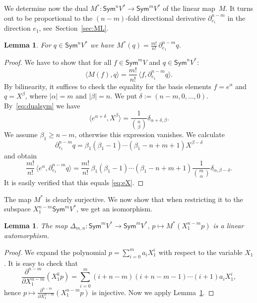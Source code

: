 \documentclass[11pt]{amsart}
\def\Sym{\mathsf{Sym}}
\numberwithin{equation}{section}
\newtheorem{lemma}[theorem]{Lemma}
\begin{document}
We determine now the dual $M^*\colon\Sym^n V^* \to \Sym^m V^*$
of the linear map~$M$. It turns out to be proportional to the $(n-m)$-fold directional 
derivative $\partial_{e_1}^{n-m}$ in the direction $e_1$, see~Section~\ref{sec:ML}.

\begin{lemma}\label{eq:dualM}
For $q\in\Sym^n V^*$ we have 
$M^*(q)=  \frac{m!}{n!}\, \partial_{e_1}^{n-m}q$. 
\end{lemma}

\begin{proof}
 We have to show that 
for all $f\in\Sym^mV$ and $q\in\Sym^n V^*$: 
$$
 \langle M(f), q \rangle = \frac{m!}{n!}\, \langle f, \partial_{e_1}^{n-m}q \rangle .
$$
By bilinearity, it suffices to check the equality for the basis elements 
$f=e^\alpha$ and $q=X^\beta$, where $|\alpha|=m$ and $|\beta|=n$. 
We put $\delta:=(n-m,0,\ldots,0)$. 
By~\eqref{eq:dualsym} we have 
\begin{equation}\label{eq:eX}
 \langle e^{\alpha+\delta}, X^\beta \rangle = \frac{1}{{n\choose \beta}} \delta_{\alpha+\delta,\beta}.
\end{equation} 
We assume $\beta_1 \ge n-m$, otherwise this expression vanishes. We calculate 
$$
 \partial_{e_1}^{n-m} q = \beta_1 ( \beta_1-1)\cdots ( \beta_1-n+m+1) X^{\beta-\delta} 
$$
and obtain 
$$
 \frac{m!}{n!}\,\langle e^{\alpha}, \partial_{e_1}^{n-m} q \rangle 
  = \frac{m!}{n!}\,\beta_1 ( \beta_1-1)\cdots ( \beta_1-n+m+1) 
  \frac{1}{{m\choose \alpha}} \delta_{\alpha,\beta-\delta} . 
$$ 
It is easily verified that this equals \eqref{eq:eX}.
\end{proof}

The map $M^*$ is clearly surjective. We now show that when restricting it to the subspace 
$X_1^{n-m}\Sym^m V^*$, we get an isomorphism.

\begin{lemma}\label{le:newscaling}
The map 
$\Delta_{m,n}\colon\Sym^m V^* \to \Sym^m V^*,\, p\mapsto M^*(X_1^{n-m}p)$
is a linear automorphism.
\end{lemma}

\begin{proof}
We expand the polynomial 
$p=\sum_{i=0}^m a_i X_1^i$ with respect to the variable $X_1$. It is easy to check that   
$$
 \frac{\partial^{n-m}}{\partial X_1^{n-m}} (X_1^k p) = \sum_{i=0}^m (i+n-m)(i+n-m-1)\cdots (i+1) a_i X_1^i ,
$$
hence $p\mapsto \frac{\partial^{n-m}}{\partial X_1^{n-m}} (X_1^{n-m} p)$ is injective. 
Now we apply Lemma~\ref{eq:dualM}. 
\end{proof}
\end{document}
